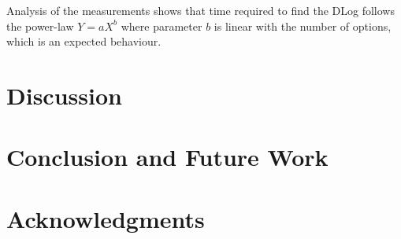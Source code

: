 \documentclass{article}
\begin{document}
Analysis of the measurements shows that time required to find the DLog follows the power-law $Y=aX^b$ where parameter $b$ is linear with the number of options, which is an expected behaviour.


\section{Discussion}

\section{Conclusion and Future Work}

\section{Acknowledgments}




\end{document}
